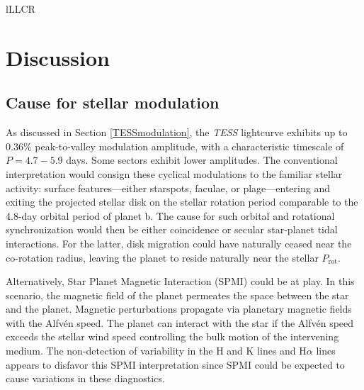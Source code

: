 \documentclass[twocolumn]{aastex631}
\begin{document}
\begin{deluxetable}{lLLCR}
    \tablewidth{0pc}
    \tabletypesize{\scriptsize}
    \startdata
    
    \enddata
\end{deluxetable}

\section{Discussion}

\subsection{Cause for stellar modulation}
As discussed in Section \ref{TESSmodulation}, the \emph{TESS} lightcurve exhibits up to $0.36\%$ peak-to-valley modulation amplitude, with a characteristic timescale of $P=4.7-5.9$ days. Some sectors exhibit lower amplitudes.  The conventional interpretation would consign these cyclical modulations to the familiar stellar activity: surface features---either starspots, faculae, or plage---entering and exiting the projected stellar disk on the stellar rotation period comparable to the 4.8-day orbital period of planet b.  The cause for such orbital and rotational synchronization would then be either coincidence or secular star-planet tidal interactions.  For the latter, disk migration could have naturally ceased near the co-rotation radius, leaving the planet to reside naturally near the stellar $P_\mathrm{rot}$.  

Alternatively, Star Planet Magnetic Interaction (SPMI) could be at play.  In this scenario, the magnetic field of the planet permeates the space between the star and the planet.  Magnetic perturbations propagate via planetary magnetic fields with the Alfv\'en speed.  The planet can interact with the star if the Alfv\'en speed exceeds the stellar wind speed controlling the bulk motion of the intervening medium.  The non-detection of variability in the  H and K lines and H$\alpha$ lines appears to disfavor this SPMI interpretation since SPMI could be expected to cause variations in these diagnostics.
\end{document}
